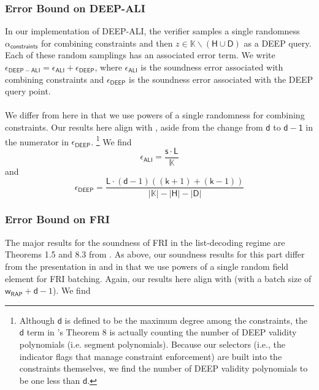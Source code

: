 \documentclass[10pt,letterpaper,titlepage]{article}
\theoremstyle{definition}
\begin{document}
\subsubsection{Error Bound on DEEP-ALI}
In our implementation of DEEP-ALI, the verifier samples a single randomness $\alpha_\mathsf{constraints}$ for combining constraints and then $z\in\mathbb{K}\backslash(\mathsf{H}\cup\mathsf{D})$ as a DEEP query. 
Each of these random samplings has an associated error term. 
We write $\epsilon_\mathsf{DEEP-ALI} = \epsilon_\mathsf{ALI} + \epsilon_\mathsf{DEEP}$, 
where $\epsilon_\mathsf{ALI}$ is the soundness error associated with combining constraints 
and $\epsilon_\mathsf{DEEP}$ is the soundness error associated with the DEEP query point. \\
\\
We differ from \cite{ethSTARK} here in that we use powers of a single randomness for combining constraints. 
Our results here align with \cite{FRIsummary}, aside from the change from $\mathsf{d}$ to $\mathsf{d-1}$ in the numerator in $\epsilon_\mathsf{DEEP}$.%
\footnote{
  Although $\mathsf{d}$ is defined to be the maximum degree among the constraints, the $\mathsf{d}$ term in \cite{FRIsummary}'s Theorem 8 is actually counting the number of DEEP validity polynomials (i.e. segment polynomials). 
  Because our selectors (i.e., the indicator flags that manage constraint enforcement) are built into the constraints themselves, we find the number of DEEP validity polynomials to be one less than $\mathsf{d}$.
}
We find 
\[
  \epsilon_\mathsf{ALI} = 
  \frac{\mathsf{s}\cdot \mathsf{L}}{\mathbb{K}}
\] 
and 
\[
  \epsilon_\mathsf{DEEP} = 
  \frac{
    \mathsf{L}\cdot(\mathsf{d}-1)((\mathsf{k}+1)+(\mathsf{k}-1))}
    {|\mathbb{K}|-|\mathsf{H}|-|\mathsf{D}|}
\]
\subsubsection{Error Bound on FRI}
The major results for the soundness of FRI in the list-decoding regime are Theorems 1.5 and 8.3 from \cite{proxGaps}. 
As above, our soundness results for this part differ from the presentation in \cite{proxGaps} and \cite{ethSTARK} in that we use powers of a single random field element for FRI batching. 
Again, our results here align with \cite{FRIsummary} (with a batch size of $\mathsf{w_{RAP}}+\mathsf{d}-1$). We find 
\end{document}
